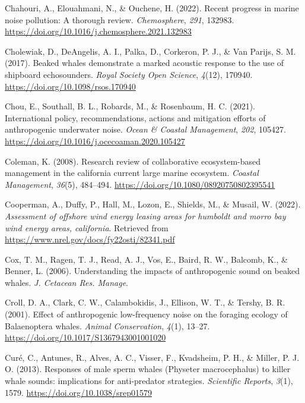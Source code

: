 \documentclass[
]{article}
\newlength{\cslhangindent}
\newlength{\cslentryspacingunit} %
\newenvironment{CSLReferences}[2] %
 {%
  \setlength{\parindent}{0pt}
  \ifodd #1
  \let\oldpar\par
  \def\par{\hangindent=\cslhangindent\oldpar}
  \fi
  \setlength{\parskip}{#2\cslentryspacingunit}
 }%
 {}
\begin{document}
\begin{CSLReferences}{1}{0}
\leavevmode{}%
Chahouri, A., Elouahmani, N., \& Ouchene, H. (2022). Recent progress in
marine noise pollution: A thorough review. \emph{Chemosphere},
\emph{291}, 132983.
\url{https://doi.org/10.1016/j.chemosphere.2021.132983}

\leavevmode{}%
Cholewiak, D., DeAngelis, A. I., Palka, D., Corkeron, P. J., \& Van
Parijs, S. M. (2017). Beaked whales demonstrate a marked acoustic
response to the use of shipboard echosounders. \emph{Royal Society Open
Science}, \emph{4}(12), 170940.
\url{https://doi.org/10.1098/rsos.170940}

\leavevmode{}%
Chou, E., Southall, B. L., Robards, M., \& Rosenbaum, H. C. (2021).
International policy, recommendations, actions and mitigation efforts of
anthropogenic underwater noise. \emph{Ocean \& Coastal Management},
\emph{202}, 105427.
\url{https://doi.org/10.1016/j.ocecoaman.2020.105427}

\leavevmode{}%
Coleman, K. (2008). Research review of collaborative ecosystem-based
management in the california current large marine ecosystem.
\emph{Coastal Management}, \emph{36}(5), 484--494.
\url{https://doi.org/10.1080/08920750802395541}

\leavevmode{}%
Cooperman, A., Duffy, P., Hall, M., Lozon, E., Shields, M., \& Musail,
W. (2022). \emph{Assessment of offshore wind energy leasing areas for
humboldt and morro bay wind energy areas, california}. Retrieved from
\url{https://www.nrel.gov/docs/fy22osti/82341.pdf}

\leavevmode{}%
Cox, T. M., Ragen, T. J., Read, A. J., Vos, E., Baird, R. W., Balcomb,
K., \& Benner, L. (2006). Understanding the impacts of anthropogenic
sound on beaked whales. \emph{J. Cetacean Res. Manage}.

\leavevmode{}%
Croll, D. A., Clark, C. W., Calambokidis, J., Ellison, W. T., \& Tershy,
B. R. (2001). Effect of anthropogenic low-frequency noise on the
foraging ecology of Balaenoptera whales. \emph{Animal Conservation},
\emph{4}(1), 13--27. \url{https://doi.org/10.1017/S1367943001001020}

\leavevmode{}%
Curé, C., Antunes, R., Alves, A. C., Visser, F., Kvadsheim, P. H., \&
Miller, P. J. O. (2013). Responses of male sperm whales (Physeter
macrocephalus) to killer whale sounds: implications for anti-predator
strategies. \emph{Scientific Reports}, \emph{3}(1), 1579.
\url{https://doi.org/10.1038/srep01579}


\end{CSLReferences}
\end{document}
